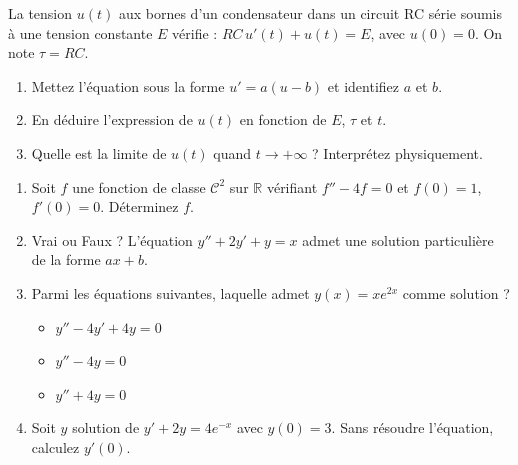 \documentclass[11pt]{article}
\begin{document}
\begin{exercice}
La tension $u(t)$ aux bornes d'un condensateur dans un circuit RC série soumis à une tension constante $E$ vérifie : $RC\, u'(t) + u(t) = E$, avec $u(0)=0$. On note $\tau = RC$.
\begin{enumerate}
    \item Mettez l'équation sous la forme $u' = a(u - b)$ et identifiez $a$ et $b$.
    \item En déduire l'expression de $u(t)$ en fonction de $E$, $\tau$ et $t$.
    \item Quelle est la limite de $u(t)$ quand $t \to +\infty$ ? Interprétez physiquement.
\end{enumerate}
\end{exercice}

\begin{exercice}
\begin{enumerate}
    \item Soit $f$ une fonction de classe $\mathcal{C}^2$ sur $\mathbb{R}$ vérifiant $f'' - 4f = 0$ et $f(0)=1$, $f'(0)=0$. Déterminez $f$.
    \item Vrai ou Faux ? L'équation $y'' + 2y' + y = x$ admet une solution particulière de la forme $ax+b$.
    \item Parmi les équations suivantes, laquelle admet $y(x) = xe^{2x}$ comme solution ?
    \begin{itemize}
        \item[1)] $y'' - 4y' + 4y = 0$
        \item[2)] $y'' - 4y = 0$
        \item[3)] $y'' + 4y = 0$
    \end{itemize}
    \item Soit $y$ solution de $y' + 2y = 4e^{-x}$ avec $y(0)=3$. Sans résoudre l'équation, calculez $y'(0)$.
\end{enumerate}
\end{exercice}
\end{document}

